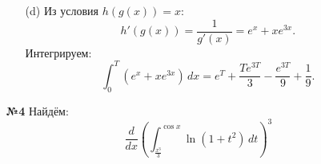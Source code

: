 \documentclass[a4paper]{article}
\begin{document}
\begin{enumerate}
\begin{enumerate}
        \item[(d)]Из условия \(h(g(x)) = x\):  
        \[
        h'(g(x)) = \frac{1}{g'(x)} = e^x + xe^{3x}.
        \]  
        Интегрируем:  
        \[
        \int_0^T (e^x + xe^{3x}) \, dx = e^T + \frac{T e^{3T}}{3} - \frac{e^{3T}}{9} + \frac{1}{9}.
        \]  

    \end{enumerate}


    \item[\textbf{№4}]Найдём:
    \[\frac{d}{dx} \left( \int_{\frac{x^3}{3}}^{\cos x} \ln(1 + t^2) \, dt \right)^3\]



\end{enumerate}
\end{document}

